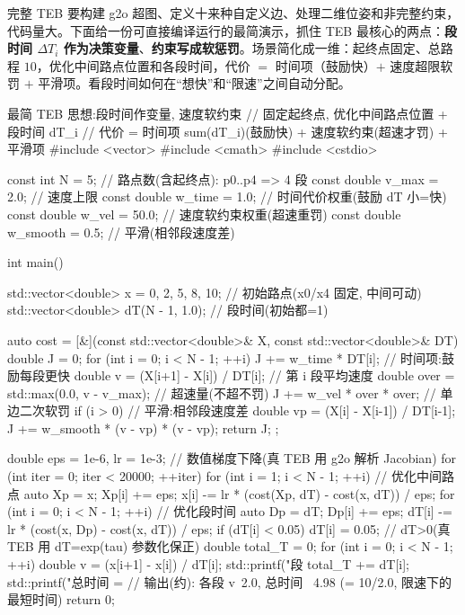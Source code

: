 完整 TEB 要构建 g2o 超图、定义十来种自定义边、处理二维位姿和非完整约束，代码量大。下面给一份可直接编译运行的最简演示，抓住 TEB 最核心的两点：\textbf{段时间 $\Delta T_i$ 作为决策变量}、\textbf{约束写成软惩罚}。场景简化成一维：起终点固定、总路程 $10$，优化中间路点位置和各段时间，代价 $=$ 时间项（鼓励快）$+$ 速度超限软罚 $+$ 平滑项。看段时间如何在“想快”和“限速”之间自动分配。

\begin{codebox}[C++]{最简 TEB 思想:段时间作变量, 速度软约束}
// 固定起终点, 优化中间路点位置 + 段时间 dT_i
// 代价 = 时间项 sum(dT_i)(鼓励快) + 速度软约束(超速才罚) + 平滑项
#include <vector>
#include <cmath>
#include <cstdio>

const int    N        = 5;      // 路点数(含起终点): p0..p4 => 4 段
const double v_max    = 2.0;    // 速度上限
const double w_time   = 1.0;    // 时间代价权重(鼓励 dT 小=快)
const double w_vel    = 50.0;   // 速度软约束权重(超速重罚)
const double w_smooth = 0.5;    // 平滑(相邻段速度差)

int main() {
  std::vector<double> x  = {0, 2, 5, 8, 10};   // 初始路点(x0/x4 固定, 中间可动)
  std::vector<double> dT(N - 1, 1.0);          // 段时间(初始都=1)

  auto cost = [&](const std::vector<double>& X, const std::vector<double>& DT) {
    double J = 0;
    for (int i = 0; i < N - 1; ++i) {
      J += w_time * DT[i];                                   // 时间项:鼓励每段更快
      double v = (X[i+1] - X[i]) / DT[i];                    // 第 i 段平均速度
      double over = std::max(0.0, v - v_max);                // 超速量(不超不罚)
      J += w_vel * over * over;                              // 单边二次软罚
      if (i > 0) {                                           // 平滑:相邻段速度差
        double vp = (X[i] - X[i-1]) / DT[i-1];
        J += w_smooth * (v - vp) * (v - vp);
      }
    }
    return J;
  };

  double eps = 1e-6, lr = 1e-3;                 // 数值梯度下降(真 TEB 用 g2o 解析 Jacobian)
  for (int iter = 0; iter < 20000; ++iter) {
    for (int i = 1; i < N - 1; ++i) {                        // 优化中间路点
      auto Xp = x; Xp[i] += eps;
      x[i] -= lr * (cost(Xp, dT) - cost(x, dT)) / eps;
    }
    for (int i = 0; i < N - 1; ++i) {                        // 优化段时间
      auto Dp = dT; Dp[i] += eps;
      dT[i] -= lr * (cost(x, Dp) - cost(x, dT)) / eps;
      if (dT[i] < 0.05) dT[i] = 0.05;          // dT>0(真 TEB 用 dT=exp(tau) 参数化保正)
    }
  }
  double total_T = 0;
  for (int i = 0; i < N - 1; ++i) {
    double v = (x[i+1] - x[i]) / dT[i];
    std::printf("段%
    total_T += dT[i];
  }
  std::printf("总时间 = %
  // 输出(约): 各段 v~2.0, 总时间 ~4.98 (= 10/2.0, 限速下的最短时间)
  return 0;
}
\end{codebox}

